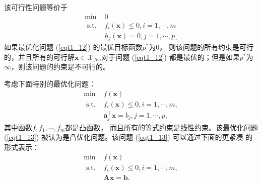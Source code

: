 该可行性问题等价于
\begin{equation}
\begin{array}{ll}
\min & 0 \\
\text { s.t. } & f_{i}(\bm{x}) \leq 0, i=1, \cdots, m \\
& h_{j}(\bm{x})=0, j=1, \cdots, p_{\circ}
\end{array}
    \label{eqt1_12}
\end{equation}
如果最优化问题 (\ref{eqt1_12}) 的最优目标函数$  p^{*}  $为$ 0 $， 则该问题的所有约束是可行的，并且所有的可行解$  \bm{x} \in \mathcal{X}_{f e a}  $对于问题 (\ref{eqt1_12}) 都是最优的；但是如果$  p^{*}  $为$
 \infty $，则该问题的约束是不可行的。
\par 考虑下面特别的最优化问题：
\begin{equation}
\begin{array}{ll}
\min & f(\bm{x}) \\
\text { s.t. } & f_{i}(\bm{x}) \leq 0, i=1, \cdots, m, \\
& \bm{a}_{j}^{\top} \bm{x}=b_{j}, j=1, \cdots, p,
\end{array}
    \label{eqt1_13}
\end{equation}
其中函数$  f, f_{1}, \cdots, f_{m}  $都是凸函数， 而且所有的等式约束是线性约束。该最优化问题 (\ref{eqt1_13}) 被认为是凸优化问题。该问题 (\ref{eqt1_13}) 可以通过下面的更紧凑 的形式表示：
\begin{equation}
\begin{array}{ll}
\min & f(\bm{x}) \\
\text { s.t. } & f_{i}(\bm{x}) \leq 0, i=1, \cdots, m, \\
& \bm{A} \bm{x}=\bm{b} .
\end{array}
    \label{eqt1_14}
\end{equation}

